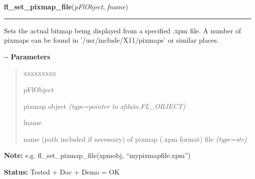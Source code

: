     \label{xformslib:flbitmap:fl_set_pixmap_file}

    \vspace{0.5ex}

\hspace{.8\funcindent}\begin{boxedminipage}{\funcwidth}

    \raggedright \textbf{fl\_set\_pixmap\_file}(\textit{pFlObject}, \textit{fname})

    \vspace{-1.5ex}

    \rule{\textwidth}{0.5\fboxrule}
\setlength{\parskip}{2ex}

Sets the actual bitmap being displayed from a specified .xpm file. A
number of pixmaps can be found in '/usr/include/X11/pixmaps' or similar
places.

-{}-
\setlength{\parskip}{1ex}
      \textbf{Parameters}
      \vspace{-1ex}

      \begin{quote}
        \begin{Ventry}{xxxxxxxxx}

          \item[pFlObject]


pixmap object
            {\it (type=pointer to xfdata.FL\_OBJECT)}

          \item[fname]


name (path included if necessary) of pixmap (.xpm format) file
            {\it (type=str)}

        \end{Ventry}

      \end{quote}

\textbf{Note:} 
e.g. fl\_set\_pixmap\_file(xpmobj, ``mypixmapfile.xpm'')


\textbf{Status:} 
Tested + Doc + Demo = OK


    \end{boxedminipage}

    \label{xformslib:flbitmap:fl_set_pixmap_file}

    \vspace{0.5ex}

